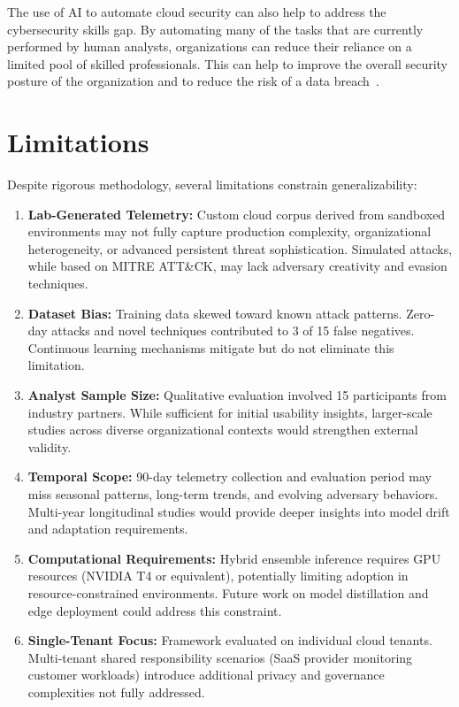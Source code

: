 The use of AI to automate cloud security can also help to address the cybersecurity skills gap. By automating many of the tasks that are currently performed by human analysts, organizations can reduce their reliance on a limited pool of skilled professionals. This can help to improve the overall security posture of the organization and to reduce the risk of a data breach~\cite{orca2024automation}.

\section{Limitations}\label{sec:conclusion-limitations}
Despite rigorous methodology, several limitations constrain generalizability:

\begin{enumerate}
    \item \textbf{Lab-Generated Telemetry:} Custom cloud corpus derived from sandboxed environments may not fully capture production complexity, organizational heterogeneity, or advanced persistent threat sophistication. Simulated attacks, while based on MITRE ATT\&CK, may lack adversary creativity and evasion techniques.
    
    \item \textbf{Dataset Bias:} Training data skewed toward known attack patterns. Zero-day attacks and novel techniques contributed to 3 of 15 false negatives. Continuous learning mechanisms mitigate but do not eliminate this limitation.
    
    \item \textbf{Analyst Sample Size:} Qualitative evaluation involved 15 participants from industry partners. While sufficient for initial usability insights, larger-scale studies across diverse organizational contexts would strengthen external validity.
    
    \item \textbf{Temporal Scope:} 90-day telemetry collection and evaluation period may miss seasonal patterns, long-term trends, and evolving adversary behaviors. Multi-year longitudinal studies would provide deeper insights into model drift and adaptation requirements.
    
    \item \textbf{Computational Requirements:} Hybrid ensemble inference requires GPU resources (NVIDIA T4 or equivalent), potentially limiting adoption in resource-constrained environments. Future work on model distillation and edge deployment could address this constraint.
    
    \item \textbf{Single-Tenant Focus:} Framework evaluated on individual cloud tenants. Multi-tenant shared responsibility scenarios (SaaS provider monitoring customer workloads) introduce additional privacy and governance complexities not fully addressed.
\end{enumerate}

